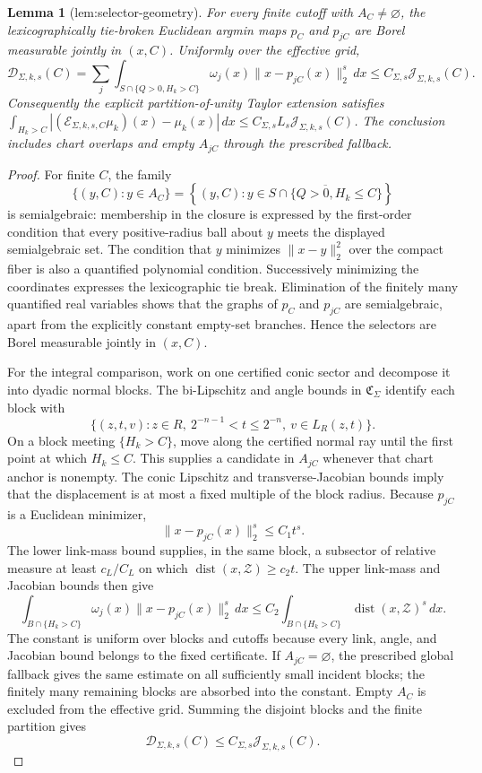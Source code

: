 \documentclass{article}
\newtheorem{lemma}{Lemma}
\begin{document}
\begin{lemma}[lem:selector-geometry]\label{lem:selector-geometry}
For every finite cutoff with \(A_C\ne\varnothing\), the lexicographically tie-broken Euclidean argmin maps \(p_C\) and \(p_{jC}\) are Borel measurable jointly in \((x,C)\). Uniformly over the effective grid, \[\mathcal D_{\Sigma,k,s}(C)=\sum_j\int_{S\cap\{Q>0,H_k>C\}}\omega_j(x)\|x-p_{jC}(x)\|_2^s\,dx\le C_{\Sigma,s}\mathcal J_{\Sigma,k,s}(C).\] Consequently the explicit partition-of-unity Taylor extension satisfies \(\int_{H_k>C}|(\mathcal E_{\Sigma,k,s,C}\mu_k)(x)-\mu_k(x)|\,dx\le C_{\Sigma,s}L_s\mathcal J_{\Sigma,k,s}(C)\). The conclusion includes chart overlaps and empty \(A_{jC}\) through the prescribed fallback.
\end{lemma}
\begin{proof}
For finite \(C\), the family
\[
\{(y,C):y\in A_C\}
=\left\{(y,C):y\in\overline{S\cap\{Q>0,H_k\le C\}}\right\}
\]
is semialgebraic: membership in the closure is expressed by the first-order condition that every positive-radius ball about \(y\) meets the displayed semialgebraic set. The condition that \(y\) minimizes \(\|x-y\|_2^2\) over the compact fiber is also a quantified polynomial condition. Successively minimizing the coordinates expresses the lexicographic tie break. Elimination of the finitely many quantified real variables shows that the graphs of \(p_C\) and \(p_{jC}\) are semialgebraic, apart from the explicitly constant empty-set branches. Hence the selectors are Borel measurable jointly in \((x,C)\).

For the integral comparison, work on one certified conic sector and decompose it into dyadic normal blocks. The bi-Lipschitz and angle bounds in \(\mathfrak C_\Sigma\) identify each block with
\[
\{(z,t,v):z\in R,\ 2^{-n-1}<t\le2^{-n},\ v\in L_R(z,t)\}.
\]
On a block meeting \(\{H_k>C\}\), move along the certified normal ray until the first point at which \(H_k\le C\). This supplies a candidate in \(A_{jC}\) whenever that chart anchor is nonempty. The conic Lipschitz and transverse-Jacobian bounds imply that the displacement is at most a fixed multiple of the block radius. Because \(p_{jC}\) is a Euclidean minimizer,
\[
\|x-p_{jC}(x)\|_2^s\le C_1t^s.
\]
The lower link-mass bound supplies, in the same block, a subsector of relative measure at least \(c_L/C_L\) on which \(\operatorname{dist}(x,\mathcal Z)\ge c_2t\). The upper link-mass and Jacobian bounds then give
\[
\int_{B\cap\{H_k>C\}}\omega_j(x)\|x-p_{jC}(x)\|_2^s\,dx
\le C_2\int_{B\cap\{H_k>C\}}\operatorname{dist}(x,\mathcal Z)^s\,dx.
\]
The constant is uniform over blocks and cutoffs because every link, angle, and Jacobian bound belongs to the fixed certificate. If \(A_{jC}=\varnothing\), the prescribed global fallback gives the same estimate on all sufficiently small incident blocks; the finitely many remaining blocks are absorbed into the constant. Empty \(A_C\) is excluded from the effective grid. Summing the disjoint blocks and the finite partition gives
\[
\mathcal D_{\Sigma,k,s}(C)\le C_{\Sigma,s}\mathcal J_{\Sigma,k,s}(C).
\]


\end{proof}
\end{document}
